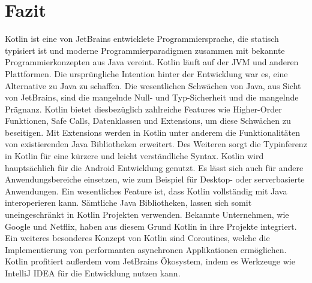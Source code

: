 \documentclass{article}
\begin{document}
\section{Fazit}
Kotlin ist eine von JetBrains entwicklete Programmiersprache, die statisch typisiert ist und moderne Programmierparadigmen zusammen mit bekannte Programmierkonzepten aus Java vereint. Kotlin läuft auf der JVM und anderen Plattformen. Die ursprüngliche Intention hinter der Entwicklung war es, eine Alternative zu Java zu schaffen. Die wesentlichen Schwächen von Java, aus Sicht von JetBrains, sind die mangelnde Null- und Typ-Sicherheit und die mangelnde Prägnanz. Kotlin bietet diesbezüglich zahlreiche Features wie Higher-Order Funktionen, Safe Calls, Datenklassen und Extensions, um diese Schwächen zu beseitigen. Mit Extensions werden in Kotlin unter anderem die Funktionalitäten von existierenden Java Bibliotheken erweitert. Des Weiteren sorgt die Typinferenz in Kotlin für eine kürzere und leicht verständliche Syntax. Kotlin wird hauptsächlich für die Android Entwicklung genutzt. Es lässt sich auch für andere Anwendungsbereiche einsetzen, wie zum Beispiel für Desktop- oder serverbasierte Anwendungen. Ein wesentliches Feature ist, dass Kotlin vollständig mit Java interoperieren kann. Sämtliche Java Bibliotheken, lassen sich somit uneingeschränkt in Kotlin Projekten verwenden. Bekannte Unternehmen, wie Google und Netflix, haben aus diesem Grund Kotlin in ihre Projekte integriert. Ein weiteres besonderes Konzept von Kotlin sind Coroutines, welche die Implementierung von performanten asynchronen Applikationen ermöglichen. Kotlin profitiert außerdem vom JetBrains Ökosystem, indem es Werkzeuge wie IntelliJ IDEA für die Entwicklung nutzen kann.



\end{document}
